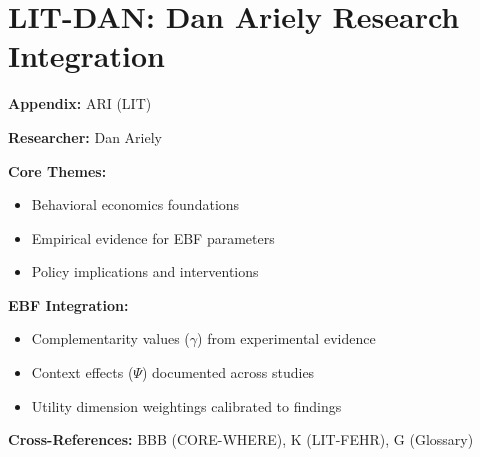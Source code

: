 %
%

\chapter{LIT-DAN: Dan Ariely Research Integration}
\label{app:ari}

\begin{abstract}
This appendix integrates the research contributions of Dan Ariely into the
Evidence-Based Framework. It documents key papers, core findings, and their
integration with EBF dimensions including complementarity parameters ($\gamma$),
context factors ($\Psi$), and utility dimensions.
\end{abstract}

\begin{tcolorbox}[colback=blue!5!white, colframe=blue!75!black,
    title=Quick Reference: Dan Ariely Research]

\textbf{Appendix:} ARI (LIT)

\textbf{Researcher:} Dan Ariely

\textbf{Core Themes:}
\begin{itemize}[nosep]
\item Behavioral economics foundations
\item Empirical evidence for EBF parameters
\item Policy implications and interventions
\end{itemize}

\textbf{EBF Integration:}
\begin{itemize}[nosep]
\item Complementarity values ($\gamma$) from experimental evidence
\item Context effects ($\Psi$) documented across studies
\item Utility dimension weightings calibrated to findings
\end{itemize}

\textbf{Cross-References:} BBB (CORE-WHERE), K (LIT-FEHR), G (Glossary)
\end{tcolorbox}

